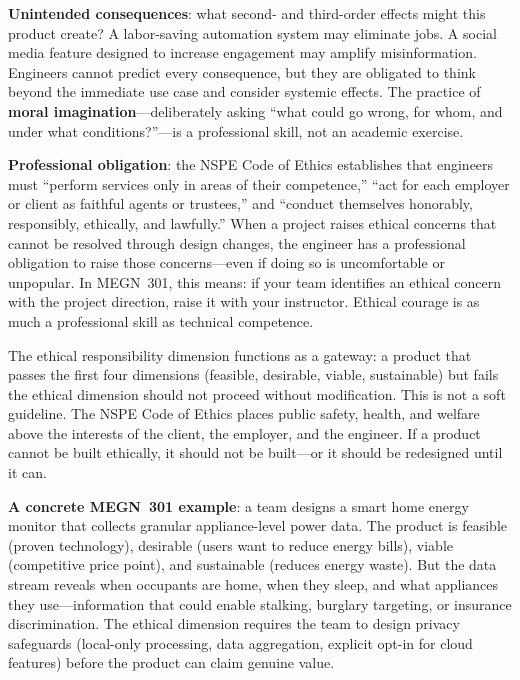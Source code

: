 \textbf{Unintended consequences}: what second- and third-order effects might this product create? A labor-saving automation system may eliminate jobs. A social media feature designed to increase engagement may amplify misinformation. Engineers cannot predict every consequence, but they are obligated to think beyond the immediate use case and consider systemic effects. The practice of \textbf{moral imagination}---deliberately asking ``what could go wrong, for whom, and under what conditions?''---is a professional skill, not an academic exercise.

\textbf{Professional obligation}: the NSPE Code of Ethics establishes that engineers must ``perform services only in areas of their competence,'' ``act for each employer or client as faithful agents or trustees,'' and ``conduct themselves honorably, responsibly, ethically, and lawfully.'' When a project raises ethical concerns that cannot be resolved through design changes, the engineer has a professional obligation to raise those concerns---even if doing so is uncomfortable or unpopular. In MEGN~301, this means: if your team identifies an ethical concern with the project direction, raise it with your instructor. Ethical courage is as much a professional skill as technical competence.

\begin{warningbox}
The ethical responsibility dimension functions as a gateway: a product that passes the first four dimensions (feasible, desirable, viable, sustainable) but fails the ethical dimension should not proceed without modification. This is not a soft guideline. The NSPE Code of Ethics places public safety, health, and welfare above the interests of the client, the employer, and the engineer. If a product cannot be built ethically, it should not be built---or it should be redesigned until it can.

\textbf{A concrete MEGN~301 example}: a team designs a smart home energy monitor that collects granular appliance-level power data. The product is feasible (proven technology), desirable (users want to reduce energy bills), viable (competitive price point), and sustainable (reduces energy waste). But the data stream reveals when occupants are home, when they sleep, and what appliances they use---information that could enable stalking, burglary targeting, or insurance discrimination. The ethical dimension requires the team to design privacy safeguards (local-only processing, data aggregation, explicit opt-in for cloud features) before the product can claim genuine value.
\end{warningbox}

